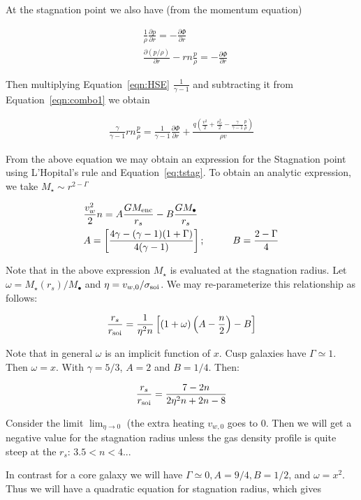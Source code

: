 \documentclass[usenatbib,fleqn]{mn2e}
\newcommand{\rs}{r_s}
\newcommand{\dxdy}[2]{\frac{\partial #1}{\partial #2} }
\newcommand{\ddr}[1]{\dxdy{#1}{r}}
\newcommand{\dpdr}{\dxdy{p}{r}}
\newcommand{\dphidr}{\dxdy{\Phi}{r}}
\newcommand{\ke}{\frac{v^2}{2}}
\newcommand{\kew}{\frac{v_w^2}{2}}
\newcommand{\gammaf}{\frac{\gamma}{\gamma-1}}
\newcommand{\cs}{\frac{p}{\rho}}
\newcommand{\Q}{q (\ke+\kew-\gammaf \cs)}
\newcommand{\Menc}{M_{\rm enc}}
\newcommand{\Mstar}{M_{\star}}
\newcommand{\Mbh}[1][]{M_{\bullet#1}}
\newcommand{\phirs}{\frac{G \Menc}{\rs}}
\newcommand{\soi}{\rm soi}
\newcommand{\rsoi}{r_{\soi}}
\newcommand{\vwO}{v_{w,0}}
\newcommand{\x}{\frac{r_s}{\rsoi}}
\begin{document}
At the stagnation point we also have (from the momentum equation)

\begin{align}
&\frac{1}{\rho}\dpdr=-\dphidr\\
&\ddr{(p/\rho)}-r n \cs=-\dphidr \label{eqn:HSE}
\end{align}

Then multiplying Equation~\ref{eqn:HSE}  $\frac{1}{\gamma-1}$ and subtracting it from Equation~\ref{eqn:combo1} we obtain

\begin{align}
\gammaf r n \cs = \frac{1}{\gamma-1} \dphidr + \frac{\Q}{\rho  v}
\end{align}

From the above equation we may obtain an expression for the Stagnation point using L'Hopital's rule and Equation~\ref{eq:tstag}. To obtain an analytic expression, we take $\Mstar\sim r^{2-\Gamma}$

\begin{align}
&\kew n =A \phirs -B \frac{G \Mbh}{\rs}\\
&A=\left[\frac{4\gamma-(\gamma-1)(1+\Gamma)}{4(\gamma-1)}\right]; \hspace{1cm} B=\frac{2-\Gamma}{4} \label{eq:stag_analytic}
\end{align}

Note that in the above expression $\Mstar$ is evaluated at the stagnation radius. Let $\omega=\Mstar(\rs)/\Mbh$ and 
$\eta=v_{w,0}/\sigma_{\rm soi}$. We may re-parameterize this relationship as follows:

\begin{align}
\x=\frac{1}{\eta^2 n}\left[ (1+\omega)\left(A-\frac{n}{2}\right)-B\right]
\end{align}

Note that in general $\omega$ is an implicit function of $x$. Cusp galaxies have $\Gamma\simeq1$.  Then $\omega=x$. With $\gamma=5/3$, $A=2$ and $B=1/4$.  Then:

\begin{align}
\x=\frac{7-2n}{2\eta^2 n+2n-8}
\end{align}

Consider the limit $\lim_{\eta \to 0}$ (the extra heating $\vwO$ goes to 0. Then we will get a negative value for the stagnation radius unless the gas density profile is quite steep at the $\rs$: $3.5<n<4$...

In contrast for a core galaxy we will have $\Gamma\simeq0, A=9/4, B=1/2$, and  $\omega=x^2$. Thus we will have a quadratic equation for stagnation radius, which gives
\end{document}
